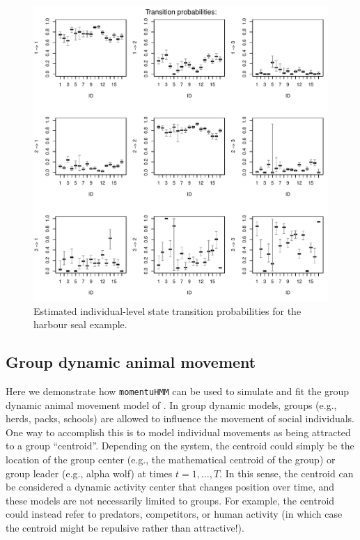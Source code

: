\documentclass[12pt]{article}\usepackage[]{graphicx}\usepackage[]{color}
\begin{document}
\begin{figure}[htbp]
  \centering
  \includegraphics[width=\textwidth]{plot_harbourSealResults021}
  \caption{Estimated individual-level state transition probabilities for the harbour seal example.}
  \label{fig:hsTPM}
\end{figure}

\subsection{Group dynamic animal movement}
\label{sec:groupModel}
Here we demonstrate how \verb|momentuHMM| can be used to simulate and fit the group dynamic animal movement model of \cite{LangrockEtAl2014}. In group dynamic models, groups (e.g., herds, packs, schools) are allowed to influence the movement of social individuals. One way to accomplish this is to model individual movements as being attracted to a group ``centroid''. Depending on the system, the centroid could simply be the location of the group center (e.g., the mathematical centroid of the group) or group leader (e.g., alpha wolf) at times $t=1,\dots,T$.  In this sense, the centroid can be considered a dynamic activity center that changes position over time, and these models are not necessarily limited to groups.  For example, the centroid could instead refer to predators, competitors, or human activity (in which case the centroid might be repulsive rather than attractive!). 
\end{document}
